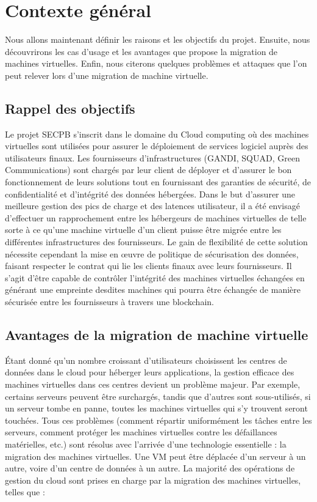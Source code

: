\newpage
\section{Contexte général}
Nous allons maintenant définir les raisons et les objectifs du projet.
Ensuite, nous découvrirons les cas d'usage et les avantages que propose la migration de machines virtuelles.
Enfin, nous citerons quelques problèmes et attaques que l'on peut relever lors d'une migration de machine virtuelle. 

\subsection{Rappel des objectifs}
Le projet SECPB s’inscrit dans le domaine du Cloud computing où des machines virtuelles sont utilisées pour assurer le déploiement de services logiciel auprès des utilisateurs finaux.
Les fournisseurs d’infrastructures (GANDI, SQUAD, Green Communications) sont chargés par leur client de déployer et d’assurer le bon fonctionnement de leurs solutions tout en fournissant des garanties de sécurité, de confidentialité et d’intégrité des données hébergées.
Dans le but d’assurer une meilleure gestion des pics de charge et des latences utilisateur, il a été envisagé d’effectuer un rapprochement entre les hébergeurs de machines virtuelles de telle sorte à ce qu’une machine virtuelle d’un client puisse être migrée entre les différentes infrastructures des fournisseurs.
Le gain de flexibilité de cette solution nécessite cependant la mise en œuvre de politique de sécurisation des données, faisant respecter le contrat qui lie les clients finaux avec leurs fournisseurs.
Il s’agit d’être capable de contrôler l’intégrité des machines virtuelles échangées en générant une empreinte desdites machines qui pourra être échangée de manière sécurisée entre les fournisseurs à travers une blockchain.

\subsection{Avantages de la migration de machine virtuelle}
Étant donné qu'un nombre croissant d'utilisateurs choisissent les centres de données dans le cloud pour héberger leurs applications,
la gestion efficace des machines virtuelles dans ces centres devient un problème majeur.
Par exemple, certains serveurs peuvent être surchargés, tandis que d'autres sont sous-utilisés, si un serveur tombe en panne, toutes les machines virtuelles qui s'y trouvent seront touchées.
Tous ces problèmes (comment répartir uniformément les tâches entre les serveurs, comment protéger les machines virtuelles contre les défaillances matérielles, etc.) sont résolus avec l'arrivée d'une technologie essentielle : la migration des machines virtuelles.
Une VM peut être déplacée d'un serveur à un autre, voire d'un centre de données à un autre.
La majorité des opérations de gestion du cloud sont prises en charge par la migration des machines virtuelles, telles que :

